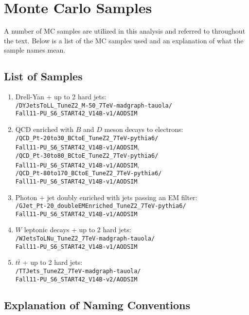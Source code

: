 \documentclass[dissertation.tex]{subfiles}
\begin{document}
\appendix
\chapter{Monte Carlo Samples}
\label{chap:Monte Carlo Samples}

A number of MC samples are utilized in this analysis and referred to throughout the text.  Below is a list of the MC samples used and an explanation of what the sample names mean.

\section{List of Samples}
\label{sec:List of Samples}

\begin{enumerate}
\item Drell-Yan + up to 2 hard jets:\\\verb+/DYJetsToLL_TuneZ2_M-50_7TeV-madgraph-tauola/+\\\verb+Fall11-PU_S6_START42_V14B-v1/AODSIM+
\item QCD enriched with $B$ and $D$ meson decays to electrons:\\\verb+/QCD_Pt-20to30_BCtoE_TuneZ2_7TeV-pythia6/+\\\verb+Fall11-PU_S6_START42_V14B-v1/AODSIM+,\\\verb+/QCD_Pt-30to80_BCtoE_TuneZ2_7TeV-pythia6/+\\\verb+Fall11-PU_S6_START42_V14B-v1/AODSIM+,\\\verb+/QCD_Pt-80to170_BCtoE_TuneZ2_7TeV-pythia6/+\\\verb+Fall11-PU_S6_START42_V14B-v1/AODSIM+
\item Photon + jet doubly enriched with jets passing an EM filter:\\\verb+/GJet_Pt-20_doubleEMEnriched_TuneZ2_7TeV-pythia6/+\\\verb+Fall11-PU_S6_START42_V14B-v1/AODSIM+
\item $W$ leptonic decays + up to 2 hard jets:\\\verb+/WJetsToLNu_TuneZ2_7TeV-madgraph-tauola/+\\\verb+Fall11-PU_S6_START42_V14B-v1/AODSIM+
\item $t\bar{t}$ + up to 2 hard jets:\\\verb+/TTJets_TuneZ2_7TeV-madgraph-tauola/+\\\verb+Fall11-PU_S6_START42_V14B-v2/AODSIM+
\end{enumerate}

\section{Explanation of Naming Conventions}
\label{sec:Explanation of Naming Conventions}
\end{document}
